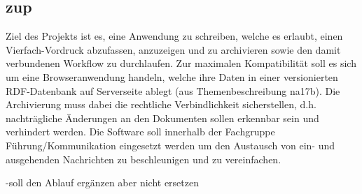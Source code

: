 \subsection{zup}
Ziel des Projekts ist es, eine Anwendung zu schreiben, welche es erlaubt, einen Vierfach-Vordruck
abzufassen, anzuzeigen und zu archivieren sowie den damit verbundenen Workflow zu durchlaufen. 
Zur maximalen Kompatibilität soll es sich um eine Browseranwendung handeln, welche ihre Daten in
einer versionierten RDF-Datenbank auf Serverseite ablegt (aus Themenbeschreibung na17b). 
Die Archivierung muss dabei die rechtliche Verbindlichkeit sicherstellen, d.h. nachträgliche
Änderungen an den Dokumenten sollen erkennbar sein und verhindert werden.
Die Software soll innerhalb der Fachgruppe Führung/Kommunikation eingesetzt werden um den Austausch 
von ein- und ausgehenden Nachrichten zu beschleunigen und zu vereinfachen.

-soll den Ablauf ergänzen aber nicht ersetzen